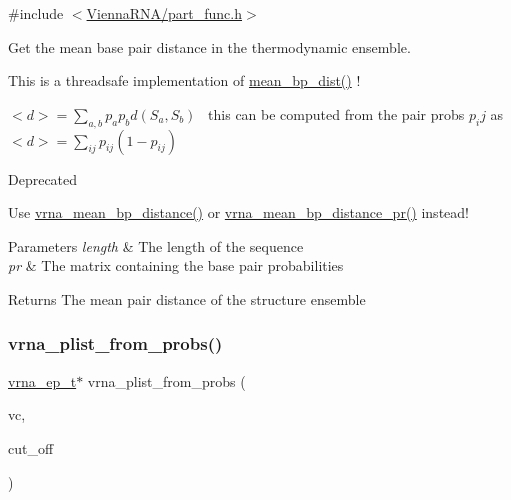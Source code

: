 {\ttfamily \#include $<$\mbox{\hyperlink{part__func_8h}{Vienna\+R\+N\+A/part\+\_\+func.\+h}}$>$}



Get the mean base pair distance in the thermodynamic ensemble. 

This is a threadsafe implementation of \mbox{\hyperlink{part__func_8h_ae9556ba7ded44fe2321b6f67c3fc02a3}{mean\+\_\+bp\+\_\+dist()}} !

$<d> = \sum_{a,b} p_a p_b d(S_a,S_b)$~\newline
this can be computed from the pair probs $p_ij$ as~\newline
 $<d> = \sum_{ij} p_{ij}(1-p_{ij})$

\begin{DoxyRefDesc}{Deprecated}
\item[\mbox{\hyperlink{deprecated__deprecated000110}{Deprecated}}]Use \mbox{\hyperlink{group__pf__fold_gaa6b8983b559b9ef4b2e1b31113ea317b}{vrna\+\_\+mean\+\_\+bp\+\_\+distance()}} or \mbox{\hyperlink{group__pf__fold_gad3f0c240512e6d43e2e4d4c2076021f5}{vrna\+\_\+mean\+\_\+bp\+\_\+distance\+\_\+pr()}} instead!\end{DoxyRefDesc}



\begin{DoxyParams}{Parameters}
{\em length} & The length of the sequence \\
\hline
{\em pr} & The matrix containing the base pair probabilities \\
\hline
\end{DoxyParams}
\begin{DoxyReturn}{Returns}
The mean pair distance of the structure ensemble 
\end{DoxyReturn}
\mbox{\label{group__pf__fold_ga94f6efc0b8d8712b023452794a0a5bd2}} 
\subsubsection{\texorpdfstring{vrna\+\_\+plist\+\_\+from\+\_\+probs()}{vrna\_plist\_from\_probs()}}
{\footnotesize\ttfamily \mbox{\hyperlink{group__struct__utils_gab9ac98ab55ded9fb90043b024b915aca}{vrna\+\_\+ep\+\_\+t}}$\ast$ vrna\+\_\+plist\+\_\+from\+\_\+probs (\begin{DoxyParamCaption}\item[{\mbox{\hyperlink{group__fold__compound_ga1b0cef17fd40466cef5968eaeeff6166}{vrna\+\_\+fold\+\_\+compound\+\_\+t}} $\ast$}]{vc,  }\item[{double}]{cut\+\_\+off }\end{DoxyParamCaption})}



